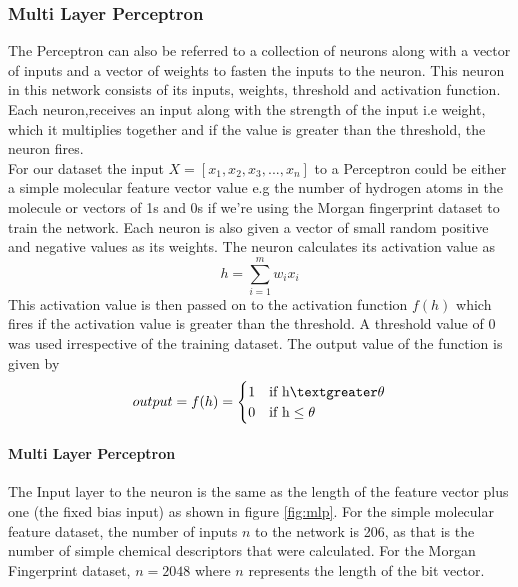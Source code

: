 \documentclass[a4paper,12pt]{report}
\begin{document}
			\subsubsection{Multi Layer Perceptron}
			The Perceptron can also be referred to a collection of neurons along with a vector of inputs and a vector of weights to fasten the inputs to the neuron. This neuron in this network consists of its inputs, weights, threshold and activation function. Each neuron,receives an input along with the strength of the input i.e weight, which it multiplies together and if the value is greater than the threshold, the neuron fires. \\
			For our dataset the input $X = [x_1,x_2,x_3,...,x_n]$ to a Perceptron could be either a simple molecular feature vector value e.g the number of hydrogen atoms in the molecule or vectors of 1s and 0s if we're using the Morgan fingerprint dataset to train the network. Each neuron is also given a vector of small random positive and negative values as its weights. The neuron calculates its activation value as 
				\begin{equation}
				h = \sum_{i=1}^{m}w_ix_i
				\end{equation}
			This activation value is then passed on to the activation function $f(h)$ which fires if the activation value is greater than the threshold. A threshold value of 0 was used irrespective of the training dataset. The output value of the function is given by
				\begin{equation}
					output = f(h) = 
					\begin{cases}
					1 & \text{if h} \textgreater \theta \\
					0 & \text{if h} \le \theta
					\end{cases}
				\end{equation}
			\paragraph{Multi Layer Perceptron}
			The Input layer to the neuron is the same as the length of the feature vector plus one (the fixed bias input) as shown in figure \ref{fig:mlp}. For the simple molecular feature dataset, the number of inputs $n$ to the network is 206, as that is the number of simple chemical descriptors that were calculated. For the Morgan Fingerprint dataset, $n = 2048$ where $n$ represents the length of the bit vector. 
			
\end{document}
